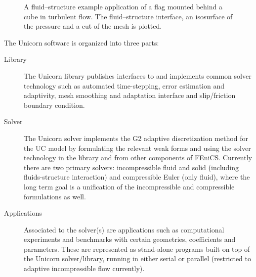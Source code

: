 
\begin{figure}
\caption{A fluid--structure example application of a flag mounted behind
a cube in turbulent flow. The fluid--structure interface, an isosurface
of the pressure and a cut of the mesh is plotted.}
\label{fig:flag3D}
\end{figure}

The Unicorn software is organized into three parts:
\begin{description}
\item[Library]
The Unicorn library publishes interfaces to and implements common
solver technology such as automated time-stepping, error
estimation and adaptivity, mesh smoothing and adaptation interface and
slip/friction boundary condition.

\item[Solver]
The Unicorn solver implements the G2 adaptive discretization method
for the UC model by formulating the relevant weak forms and using the
solver technology in the library and from other components of
FEniCS. Currently there are two primary solvers: incompressible
fluid and solid (including fluids-structure interaction) and compressible
Euler (only fluid), where the long term goal is a unification of the
incompressible and compressible formulations as well.

\item[Applications]
Associated to the solver(s) are applications such as computational
experiments and benchmarks with certain geometries, coefficients and
parameters. These are represented as stand-alone programs built on top
of the Unicorn solver/library, running in either serial or parallel
(restricted to adaptive incompressible flow currently).
\end{description}

